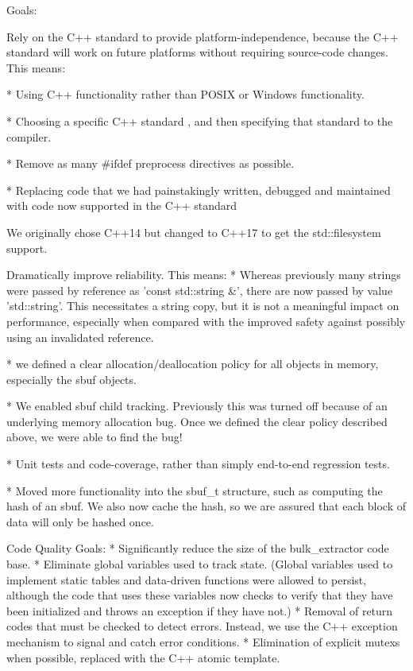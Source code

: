 Goals:

Rely on the C++ standard to provide platform-independence, because the
C++ standard will work on future platforms without requiring
source-code changes. This means:

* Using C++ functionality rather than POSIX or Windows functionality.

* Choosing a specific C++ standard , and then
specifying that standard to the compiler.


* Remove as many \#ifdef preprocess directives as possible.

* Replacing code that we had painstakingly written, debugged and
maintained with code now supported in the C++ standard

We originally chose C++14 but changed to C++17 to get the
std::filesystem support.


Dramatically improve reliability. This means:
* Whereas previously many strings were passed by reference as 'const std::string &',
there are now passed by value 'std::string'. This necessitates a
string copy, but it is not a meaningful impact on performance,
especially when compared with the improved safety against possibly
using an invalidated reference.

* we defined a clear allocation/deallocation policy for all
objects in memory, especially the sbuf objects.

* We enabled sbuf child tracking. Previously this was turned off
because of an underlying memory allocation bug. Once we defined the
clear policy described above, we were able to find the bug!

* Unit tests and code-coverage, rather than simply end-to-end
regression tests.

* Moved more functionality into the sbuf_t structure, such as
computing the hash of an sbuf. We also now cache the hash, so we are
assured that each block of data will only be hashed once.


Code Quality Goals:
* Significantly reduce the size of the bulk_extractor code base.
* Eliminate global variables used to track state. (Global variables
used to implement static tables and data-driven functions were allowed
to persist, although the code that uses these variables now checks to
verify that they have been initialized and throws an exception if they
have not.)
* Removal of return codes that must be checked to detect
errors. Instead, we use the C++ exception mechanism to signal and
catch error conditions.
* Elimination of explicit mutexs when possible, replaced with the C++
atomic template.

